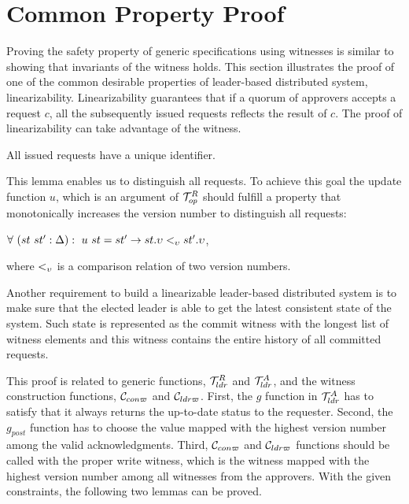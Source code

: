\section{Common Property Proof}
\label{chapter:witnesspassing:sec:prove-safety-with-witness}

Proving the safety property of generic specifications using witnesses is 
similar to showing that invariants of the witness holds.
This section illustrates the proof of one of the common desirable properties
of leader-based distributed system, linearizability.
Linearizability guarantees that if a quorum of approvers accepts a request $c$, 
all the subsequently issued requests reflects the result of $c$. 
The proof of linearizability can take advantage of the witness. 

\begin{lemma}
All issued requests have a unique identifier.
\end{lemma}

This lemma enables us to distinguish all requests. To achieve this goal the 
update function $u$, which is an argument of $\mathcal{T}^{R}_{op}$ should fulfill a 
property that monotonically increases the version number to distinguish all
requests:
\begin{center}
$\forall \ (st \ st' : \Delta) : \ u \ st = st' \rightarrow st.\upsilon
<_{\upsilon} st'.\upsilon$,
\end{center}
where $<_{\upsilon}$ is a comparison relation of two version numbers.

Another requirement to build a linearizable leader-based distributed system 
is to make sure that the elected leader is able to get the latest consistent
state of the system. Such state is represented as the commit witness with the
longest list of witness elements and this witness contains the entire history of
all committed requests. 

This proof is related to generic functions, $\mathcal{T}^{R}_{ldr}$ and $\mathcal{T}^{A}_{ldr}$, 
and the witness construction functions, $\mathcal{C}_{con\varpi}$ and $\mathcal{C}_{ldr\varpi}$.
First, the $g$ function in $\mathcal{T}^{A}_{ldr}$ has to satisfy that  
it always returns the up-to-date status to the requester.
Second, the $g_{post}$ function has to choose the value mapped with the highest 
version number among the valid acknowledgments. 
Third, $\mathcal{C}_{con\varpi}$ and $\mathcal{C}_{ldr\varpi}$ functions should be called with the proper 
write witness, which is the witness mapped with the highest version number 
among all witnesses from the approvers. 
With the given constraints, the following two lemmas can be proved.

